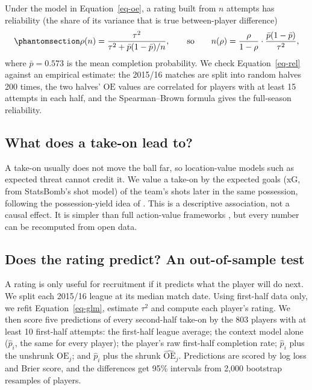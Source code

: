 \documentclass[
  12pt]{article}
\begin{document}
Under the model in Equation~\ref{eq-oe}, a rating built from \(n\)
attempts has reliability (the share of its variance that is true
between-player difference)
\begin{equation}\protect\phantomsection\label{eq-rel}{\rho(n) = \frac{\tau^2}{\tau^2 + \bar p(1-\bar p)/n},\qquad\text{so}\qquad n(\rho) = \frac{\rho}{1-\rho}\cdot\frac{\bar p(1-\bar p)}{\tau^2},}\end{equation}
where \(\bar p=0.573\) is the mean completion probability. We check
Equation~\ref{eq-rel} against an empirical estimate: the 2015/16 matches
are split into random halves 200 times, the two halves' \(\mathrm{OE}\)
values are correlated for players with at least 15 attempts in each
half, and the Spearman--Brown formula gives the full-season reliability.

\subsection{What does a take-on lead
to?}\label{what-does-a-take-on-lead-to}

A take-on usually does not move the ball far, so location-value models
such as expected threat \citep{singh2018xt, rudd2011} cannot credit it.
We value a take-on by the expected goals (xG, from StatsBomb's shot
model) of the team's shots later in the same possession, following the
possession-yield idea of \citet{pollard1997}. This is a descriptive
association, not a causal effect. It is simpler than full action-value
frameworks \citep{decroos2019, fernandez2021}, but every number can be
recomputed from open data.

\subsection{Does the rating predict? An out-of-sample
test}\label{sec-valid-method}

A rating is only useful for recruitment if it predicts what the player
will do next. We split each 2015/16 league at its median match date.
Using first-half data only, we refit Equation~\ref{eq-glm}, estimate
\(\tau^2\) and compute each player's rating. We then score five
predictions of every second-half take-on by the 803 players with at
least 10 first-half attempts: the first-half league average; the context
model alone (\(\hat p_i\), the same for every player); the player's raw
first-half completion rate; \(\hat p_i\) plus the unshrunk
\(\mathrm{OE}_j\); and \(\hat p_i\) plus the shrunk
\(\widehat{\mathrm{OE}}_j\). Predictions are scored by log loss and
Brier score, and the differences get 95\% intervals from 2,000 bootstrap
resamples of players.
\end{document}
